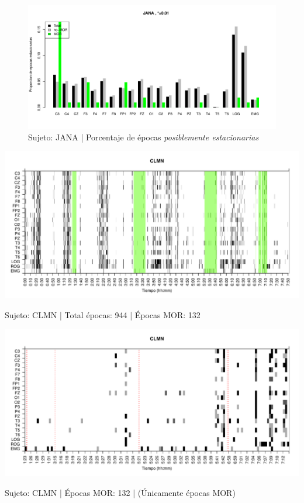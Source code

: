 \begin{figure}
\centering
\includegraphics[width=\linewidth]
{./material_bonito170220/porcentaje_bis/JANASUE_103_907_1_bar_porcentaje.pdf} 
\caption{Sujeto: JANA | Porcentaje de \'epocas \textit{posiblemente estacionarias}}
\end{figure}


\begin{SidewaysFigure}
\centering
\includegraphics[width=\linewidth]
{./material_bonito170220/CLMN10SUE_132_mor132_tot944_est_total.pdf} 
\caption{Sujeto: CLMN | Total \'epocas: 944 | \'Epocas MOR: 132}
\end{SidewaysFigure}
\begin{SidewaysFigure}
\centering
\includegraphics[width=\linewidth]
{./material_bonito170220/CLMN10SUE_132_mor132_tot132_est_mor.pdf} 
\caption{Sujeto: CLMN | \'Epocas MOR: 132 | (\'Unicamente \'epocas MOR)}
\end{SidewaysFigure}

